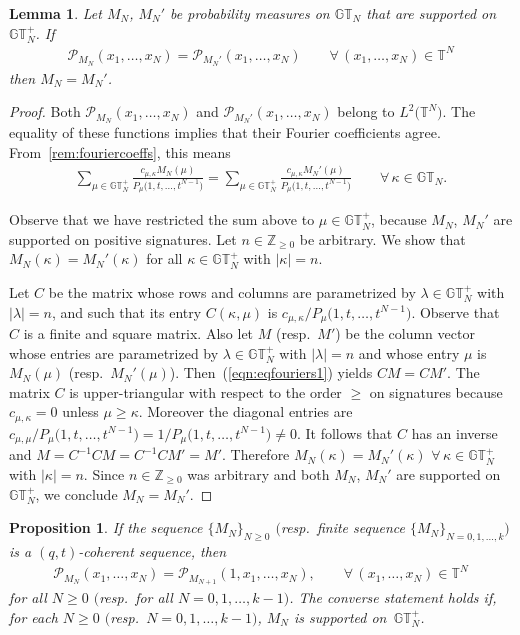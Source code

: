 \documentclass[pdftex]{sigma}
\numberwithin{equation}{section}
\newtheorem{lem}[thm]{Lemma}
\newtheorem{prop}[thm]{Proposition}
\newcommand{\Z}{\mathbb{Z}}
\newcommand{\GT}{\mathbb{GT}}
\newcommand{\GTp}{\mathbb{GT}^+}
\newcommand{\PPP}{\mathcal{P}}
\newcommand{\TT}{\mathbb{T}}
\begin{document}
\begin{lem}\label{cor:generating}
Let $M_N$, $M_N'$ be probability measures on $\GT_N$ that are supported on $\GTp_N$. If
\begin{gather*}
\PPP_{M_N}(x_1, \dots, x_N) = \PPP_{M_N'}(x_1, \dots, x_N) \qquad \forall\, (x_1, \dots, x_N)\in\TT^N
\end{gather*}
then $M_N = M_N'$.
\end{lem}
\begin{proof}
Both $\PPP_{M_N}(x_1, \dots, x_N)$ and $\PPP_{M_N'}(x_1, \dots, x_N)$ belong to $L^2\big(\TT^N\big)$.
The equality of these functions implies that their Fourier coef\/f\/icients agree.
From~\eqref{rem:fouriercoeffs}, this means
\begin{gather}\label{eqn:eqfouriers1}
\sum_{\mu\in\GTp_N}{\frac{c_{\mu, \kappa}M_N(\mu)}{P_{\mu}\big(1, t, \dots, t^{N-1}\big)}}
= \sum_{\mu\in\GTp_N}{\frac{c_{\mu, \kappa}M_N'(\mu)}{P_{\mu}\big(1, t, \dots, t^{N-1}\big)}} \qquad \forall\, \kappa\in\GT_N.
\end{gather}

Observe that we have restricted the sum above to $\mu\in\GTp_N$, because $M_N$, $M_N'$ are supported on positive signatures.
Let $n\in\Z_{\geq 0}$ be arbitrary. We show that $M_N(\kappa) = M_N'(\kappa)$ for all $\kappa\in\GTp_N$ with $|\kappa| = n$.

Let $C$ be the matrix whose rows and columns are parametrized by $\lambda\in\GTp_N$ with $|\lambda| = n$, and such that its entry $C(\kappa, \mu)$ is $c_{\mu, \kappa}/P_{\mu}\big(1, t, \dots, t^{N-1}\big)$. Observe that $C$ is a f\/inite and square matrix.
Also let $M$ (resp.~$M'$) be the column vector whose entries are parametrized by $\lambda\in\GTp_N$ with $|\lambda| = n$ and whose entry $\mu$ is $M_N(\mu)$ (resp.~$M_N'(\mu)$). Then~(\ref{eqn:eqfouriers1}) yields $CM = CM'$. The matrix $C$ is upper-triangular with respect to the order $\geq$ on signatures because $c_{\mu, \kappa} = 0$ unless $\mu \geq \kappa$. Moreover the diagonal entries are $c_{\mu, \mu}/P_{\mu}\big(1, t, \dots, t^{N-1}\big) = 1/P_{\mu}\big(1, t, \dots, t^{N-1}\big) \neq 0$. It follows that $C$ has an inverse and $M = C^{-1}CM = C^{-1}CM' = M'$. Therefore $M_N(\kappa) = M_N'(\kappa)$ $\forall\, \kappa\in\GTp_N$ with $|\kappa| = n$. Since $n\in\Z_{\geq 0}$ was arbitrary and both $M_N$, $M_N'$ are supported on~$\GTp_N$, we conclude $M_N = M_N'$.
\end{proof}

\begin{prop}\label{prop:coherentsequences}
If the sequence $\{M_N\}_{N\geq 0}$ $($resp.\ finite sequence $\{M_N\}_{N=0, 1, \dots, k})$ is a $(q, t)$-coherent sequence, then
\begin{gather*}
\PPP_{M_N}(x_1, \dots, x_N) = \PPP_{M_{N+1}}(1, x_1, \dots, x_N), \qquad \forall\, (x_1, \dots, x_N)\in\TT^N
\end{gather*}
for all $N\geq 0$ $($resp.\ for all $N = 0, 1, \dots, k-1)$. The converse statement holds if, for each $N\geq 0$ $($resp.\ $N = 0, 1, \dots, k-1)$, $M_N$ is supported on~$\GTp_N$.
\end{prop}
\end{document}
